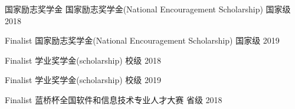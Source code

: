



\begin{cvhonors}

  \cvhonor
    {国家励志奖学金} %
    {国家励志奖学金(National Encouragement Scholarship)} %
    {国家级} %
    {2018} %

  \cvhonor
    {Finalist} %
    {国家励志奖学金(National Encouragement Scholarship)} %
    {国家级} %
    {2019} %

  \cvhonor
    {Finalist} %
    {学业奖学金(scholarship)} %
    {校级} %
    {2018} %

  \cvhonor
    {Finalist} %
    {学业奖学金(scholarship)} %
    {校级} %
    {2019} %

  \cvhonor
    {Finalist} %
    {蓝桥杯全国软件和信息技术专业人才大赛} %
    {省级} %
    {2018} %

\end{cvhonors}




